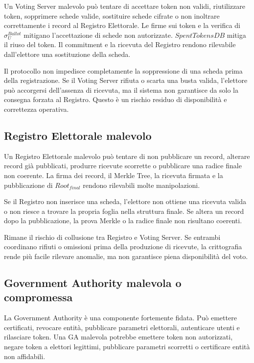 \documentclass[a4paper,12pt]{article}
\begin{document}
Un Voting Server malevolo può tentare di accettare token non validi, riutilizzare token, sopprimere schede valide, sostituire schede cifrate o non inoltrare correttamente i record al Registro Elettorale.
Le firme sui token e la verifica di \(\sigma_U^{Ballot}\) mitigano l'accettazione di schede non autorizzate.
\(SpentTokensDB\) mitiga il riuso del token.
Il commitment e la ricevuta del Registro rendono rilevabile dall'elettore una sostituzione della scheda.

Il protocollo non impedisce completamente la soppressione di una scheda prima della registrazione.
Se il Voting Server rifiuta o scarta una busta valida, l'elettore può accorgersi dell'assenza di ricevuta, ma il sistema non garantisce da solo la consegna forzata al Registro.
Questo è un rischio residuo di disponibilità e correttezza operativa.

\subsection{Registro Elettorale malevolo}

Un Registro Elettorale malevolo può tentare di non pubblicare un record, alterare record già pubblicati, produrre ricevute scorrette o pubblicare una radice finale non coerente.
La firma dei record, il Merkle Tree, la ricevuta firmata e la pubblicazione di \(Root_{final}\) rendono rilevabili molte manipolazioni.

Se il Registro non inserisce una scheda, l'elettore non ottiene una ricevuta valida o non riesce a trovare la propria foglia nella struttura finale.
Se altera un record dopo la pubblicazione, la prova Merkle o la radice finale non risultano coerenti.

Rimane il rischio di collusione tra Registro e Voting Server.
Se entrambi coordinano rifiuti o omissioni prima della produzione di ricevute, la crittografia rende più facile rilevare anomalie, ma non garantisce piena disponibilità del voto.

\subsection{Government Authority malevola o compromessa}

La Government Authority è una componente fortemente fidata.
Può emettere certificati, revocare entità, pubblicare parametri elettorali, autenticare utenti e rilasciare token.
Una GA malevola potrebbe emettere token non autorizzati, negare token a elettori legittimi, pubblicare parametri scorretti o certificare entità non affidabili.
\end{document}
